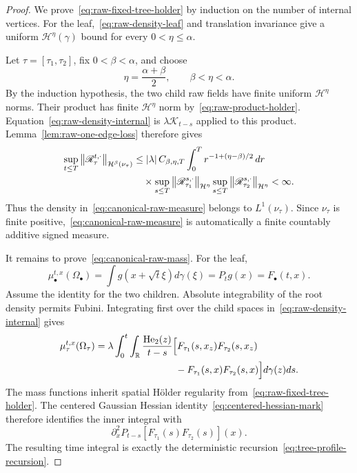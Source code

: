 \begin{proof}
We prove~\eqref{eq:raw-fixed-tree-holder} by induction on the number of internal vertices. For the leaf,~\eqref{eq:raw-density-leaf} and translation invariance give a uniform $\mathcal H^\eta(\gamma)$ bound for every $0<\eta\leq\alpha$.

Let $\tau=[\tau_1,\tau_2]$, fix $0<\beta<\alpha$, and choose
\begin{equation*}
  \eta=\frac{\alpha+\beta}{2},
  \qquad
  \beta<\eta<\alpha.
\end{equation*}
By the induction hypothesis, the two child raw fields have finite uniform $\mathcal H^\eta$ norms. Their product has finite $\mathcal H^\eta$ norm by~\eqref{eq:raw-product-holder}. Equation~\eqref{eq:raw-density-internal} is $\lambda\mathcal K_{t-s}$ applied to this product. Lemma~\ref{lem:raw-one-edge-loss} therefore gives
\begin{align*}
  \sup_{t\leq T}
  \left\lVert\mathscr R_\tau^{t,\cdot}\right\rVert_{\mathcal H^\beta(\nu_\tau)}
  &\leq
  \left|\lambda\right| C_{\beta,\eta,T}
  \int_0^T
  r^{-1+(\eta-\beta)/2}\,dr\\
  &\quad\times
  \sup_{s\leq T}
  \left\lVert\mathscr R_{\tau_1}^{s,\cdot}\right\rVert_{\mathcal H^\eta}
  \sup_{s\leq T}
  \left\lVert\mathscr R_{\tau_2}^{s,\cdot}\right\rVert_{\mathcal H^\eta}
  <\infty.
\end{align*}
Thus the density in~\eqref{eq:canonical-raw-measure} belongs to $L^1(\nu_\tau)$. Since $\nu_\tau$ is finite positive,~\eqref{eq:canonical-raw-measure} is automatically a finite countably additive signed measure.

It remains to prove~\eqref{eq:canonical-raw-mass}. For the leaf,
\begin{equation*}
  \mu_\bullet^{t,x}(\Omega_\bullet)
  =
  \int g(x+\sqrt t\xi)d\gamma(\xi)
  =
  P_tg(x)
  =
  F_\bullet(t,x).
\end{equation*}
Assume the identity for the two children. Absolute integrability of the root density permits Fubini. Integrating first over the child spaces in~\eqref{eq:raw-density-internal} gives
\begin{align*}
  \mu_\tau^{t,x}(\Omega_\tau)
  ={}&
  \lambda\int_0^t\int_\mathbb R
  \frac{\operatorname{He}_2(z)}{t-s}
  \Bigl[
    F_{\tau_1}(s,x_z)F_{\tau_2}(s,x_z)
  \notag\\
  &\hspace{7em}-
    F_{\tau_1}(s,x)F_{\tau_2}(s,x)
  \Bigr]
  d\gamma(z)ds.
\end{align*}
The mass functions inherit spatial H\"older regularity from~\eqref{eq:raw-fixed-tree-holder}. The centered Gaussian Hessian identity~\eqref{eq:centered-hessian-mark} therefore identifies the inner integral with
\begin{equation*}
  \partial_x^2P_{t-s}
  [F_{\tau_1}(s)F_{\tau_2}(s)](x).
\end{equation*}
The resulting time integral is exactly the deterministic recursion~\eqref{eq:tree-profile-recursion}.
\end{proof}

